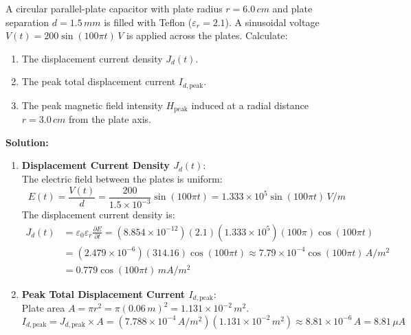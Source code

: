 \begin{example}
A circular parallel-plate capacitor with plate radius $r = 6.0\,\si{cm}$ and plate separation $d = 1.5\,\si{mm}$ is filled with Teflon ($\varepsilon_r = 2.1$). A sinusoidal voltage $V(t) = 200 \sin(100\pi t)\,\si{V}$ is applied across the plates. Calculate:
\begin{enumerate}
    \item The displacement current density $J_d(t)$.
    \item The peak total displacement current $I_{d,\text{peak}}$.
    \item The peak magnetic field intensity $H_{\text{peak}}$ induced at a radial distance $r = 3.0\,\si{cm}$ from the plate axis.
\end{enumerate}

\textbf{Solution:}
\begin{enumerate}
    \item \textbf{Displacement Current Density $J_d(t)$}:\\
    The electric field between the plates is uniform:
    \begin{equation*}
        E(t) = \frac{V(t)}{d} = \frac{200}{1.5 \times 10^{-3}} \sin(100\pi t) = 1.333 \times 10^5 \sin(100\pi t)\,\si{V/m}
    \end{equation*}
    The displacement current density is:
    \begin{align*}
        J_d(t) &= \varepsilon_0 \varepsilon_r \frac{\partial E}{\partial t} = (8.854 \times 10^{-12})(2.1)(1.333 \times 10^5)(100\pi) \cos(100\pi t) \\
        &= (2.479 \times 10^{-6})(314.16) \cos(100\pi t) \approx 7.79 \times 10^{-4} \cos(100\pi t)\,\si{A/m^2} \\
        &= 0.779 \cos(100\pi t)\,\si{mA/m^2}
    \end{align*}
    
    \item \textbf{Peak Total Displacement Current $I_{d,\text{peak}}$}:\\
    Plate area $A = \pi r^2 = \pi (0.06\,\si{m})^2 = 1.131 \times 10^{-2}\,\si{m^2}$.
    \begin{equation*}
        I_{d,\text{peak}} = J_{d,\text{peak}} \times A = (7.788 \times 10^{-4}\,\si{A/m^2})(1.131 \times 10^{-2}\,\si{m^2}) \approx 8.81 \times 10^{-6}\,\si{A} = 8.81\,\si{\mu A}
    \end{equation*}
    

\end{enumerate}
\end{example}

